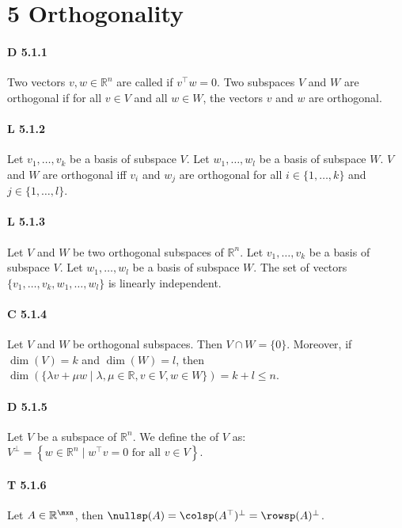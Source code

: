 \section*{5 Orthogonality}

\paragraph{D 5.1.1} Two vectors $v,w\in\mathbb{R}^n$ are
called  if $v^\top w=0$. Two subspaces $V$ and $W$
are orthogonal if for all $v\in V$ and all $w\in W$, the vectors
$v$ and $w$ are orthogonal.

\paragraph{L 5.1.2} Let $v_1,\dots,v_k$ be a basis of subspace
$V$. Let $w_1,\dots,w_l$ be a basis of subspace $W$. $V$ and $W$
are orthogonal iff $v_i$ and $w_j$ are orthogonal for
all $i\in\{1,\dots,k\}$ and $j\in\{1,\dots,l\}$.

\paragraph{L 5.1.3} Let $V$ and $W$ be two orthogonal subspaces of
$\mathbb{R}^n$. Let $v_1,\dots,v_k$ be a basis of subspace $V$. Let
$w_1,\dots,w_l$ be a basis of subspace $W$. The set of vectors
$\{v_1,\dots,v_k,w_1,\dots,w_l\}$ is linearly
independent.

\paragraph{C 5.1.4} Let $V$ and $W$ be orthogonal subspaces. Then
$V\cap W=\{0\}$. Moreover, if $\dim(V)=k$ and $\dim(W)=l$, then $\dim(\{\lambda v+\mu w\mid\lambda,\mu\in\mathbb{R},v\in V,w\in W\})=k+l\leq n$.

\paragraph{D 5.1.5} Let $V$ be a subspace of $\mathbb{R}^n$. We define
the  of $V$ as: $V^\bot = \left\{ w\in\mathbb{R}^n\mid w^\top v=0\text{ for all }v\in V \right\}$.

\paragraph{T 5.1.6} Let $A\in\mathbb{R}^{\mxn}$, then
$\nullsp(A)=\colsp(A^\top)^\bot=\rowsp(A)^\bot$.

